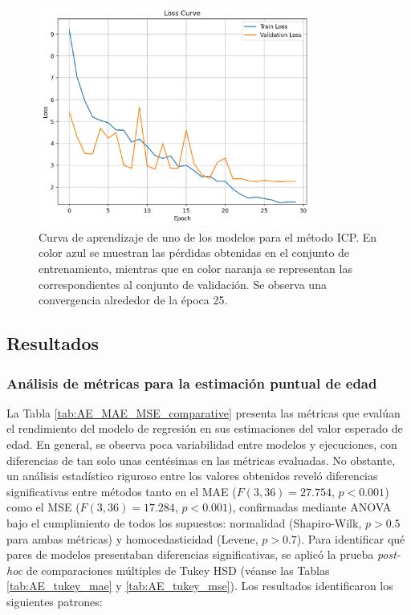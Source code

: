 \begin{figure}[htbp]
    \centering
    \includegraphics[width=0.8\textwidth]{capitulos/cap_05/imagenes/learning_curve_AE_model02_ICP.png}
    \caption[
        Curva de aprendizaje de uno de los modelos para el método ICP.
    ]{
        Curva de aprendizaje de uno de los modelos para el método ICP. 
        En color azul se muestran las pérdidas obtenidas en el conjunto de entrenamiento, mientras que en color naranja se representan las correspondientes al conjunto de validación. 
        Se observa una convergencia alrededor de la época 25.
    } 
    \label{fig:learning_curve_AE_model02_ICP}
\end{figure}


\subsection{Resultados}

\subsubsection{Análisis de métricas para la estimación puntual de edad}

La Tabla \ref{tab:AE_MAE_MSE_comparative} presenta las métricas que evalúan el rendimiento del modelo de regresión en sus estimaciones del valor esperado de edad. En general, se observa poca variabilidad entre modelos y ejecuciones, con diferencias de tan solo unas centésimas en las métricas evaluadas. No obstante, un análisis estadístico riguroso entre los valores obtenidos reveló diferencias significativas entre métodos tanto en el MAE ($F(3, 36) = 27.754$, $p < 0.001$) como el MSE ($F(3, 36) = 17.284$, $p < 0.001$), confirmadas mediante ANOVA bajo el cumplimiento de todos los supuestos: normalidad (Shapiro-Wilk, $p > 0.5$ para ambas métricas) y homocedasticidad (Levene, $p>0.7$). Para identificar qué pares de modelos presentaban diferencias significativas, se aplicó la prueba \textit{post-hoc} de comparaciones múltiples de Tukey HSD
(véanse las Tablas \ref{tab:AE_tukey_mae} y \ref{tab:AE_tukey_mse}). Los resultados identificaron los siguientes patrones:

